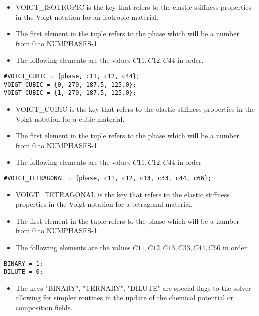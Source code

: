 \documentclass[a4paper,10pt]{article}
\begin{document}
\begin{itemize}
 \item VOIGT\_ISOTROPIC is the key that refers to the elastic stiffness properties in the Voigt notation for an isotropic material. 
 \item The first element in the tuple refers to the phase which will be a number from 0 to NUMPHASES-1.
 \item The following elements are the values $C11,C12,C44$ in order.
\end{itemize}


\begin{lstlisting}
#VOIGT_CUBIC = {phase, c11, c12, c44};
VOIGT_CUBIC = {0, 270, 187.5, 125.0};
VOIGT_CUBIC = {1, 270, 187.5, 125.0};
\end{lstlisting}

\begin{itemize}
 \item VOIGT\_CUBIC is the key that refers to the elastic stiffness properties in the Voigt notation for a cubic material. 
 \item The first element in the tuple refers to the phase which will be a number from 0 to NUMPHASES-1
 \item The following elements are the values $C11,C12,C44$ in order
\end{itemize}

\begin{lstlisting}
#VOIGT_TETRAGONAL = {phase, c11, c12, c13, c33, c44, c66};
\end{lstlisting}

\begin{itemize}
 \item VOIGT\_TETRAGONAL is the key that refers to the elastic stiffness properties in the Voigt notation for a tetragonal material. 
 \item The first element in the tuple refers to the phase which will be a number from 0 to NUMPHASES-1.
 \item The following elements are the values $C11,C12,C13,C33,C44,C66$ in order.
\end{itemize}

\begin{lstlisting}
BINARY = 1;
DILUTE = 0;
\end{lstlisting}

\begin{itemize}
 \item The keys "BINARY", "TERNARY", "DILUTE" are special flags to the solver allowing for simpler routines in the update of the chemical potential or composition fields.
\end{itemize}
\end{document}
